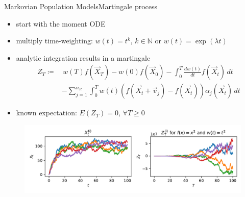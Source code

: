 \documentclass[9pt]{beamer}
\newcommand{\expSym}{{E}}
\newcommand{\E}[1]{\ensuremath{\expSym\left(#1\right)}}
\begin{document}
\begin{frame}{Markovian Population Models}{Martingale process}
    \begin{itemize}
        \item start with the moment ODE
    \item multiply time-weighting: $w(t)=t^k$, $k\in\mathbb{N}$ or $w(t)=\exp(\lambda t)$
    \item analytic integration results in a martingale 
        \begin{equation*}
            \begin{split}
            Z_T\coloneqq&\,w(T)f(\vec X_T) - w(0)f(\vec X_{0}) -
            \int_{0}^T\frac{dw(t)}{dt}f(\vec X_t)\,dt\\
            &-\sum_{j=1}^{n_R}\int_{0}^Tw(t)
                 (f(\vec X_t+\vec v_j) - f(\vec X_t))\alpha_j(\vec X_t)\,dt
         \end{split}
        \end{equation*}
    \item known expectation: $\E{Z_T}=0$, $\forall T\geq 0$
  \end{itemize}
    \vspace{-1em}
    \begin{figure}
        \includegraphics[scale=.5]{../gfx/martingales.pdf}
    \end{figure}
    \vspace{-2em}
\end{frame}
\end{document}
